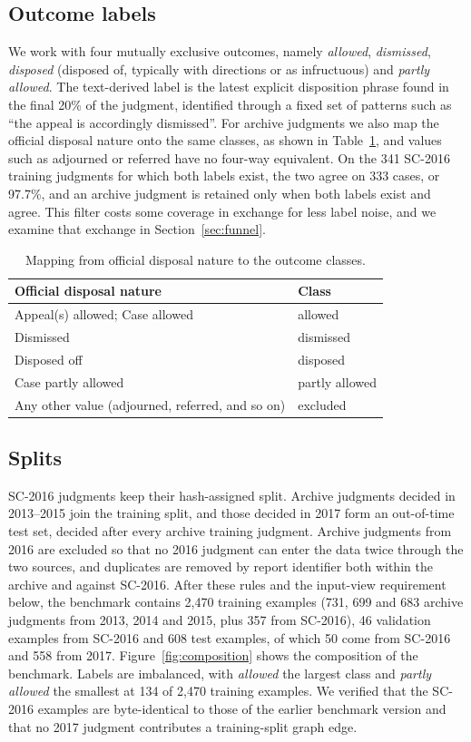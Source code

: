 \documentclass[11pt,a4paper]{article}
\newcommand{\cls}[1]{\emph{#1}}
\begin{document}
\subsection{Outcome labels}
We work with four mutually exclusive outcomes, namely \cls{allowed}, \cls{dismissed}, \cls{disposed} (disposed of, typically with directions or as infructuous) and \cls{partly allowed}. The text-derived label is the latest explicit disposition phrase found in the final 20\% of the judgment, identified through a fixed set of patterns such as ``the appeal is accordingly dismissed''. For archive judgments we also map the official disposal nature onto the same classes, as shown in Table~\ref{tab:map}, and values such as adjourned or referred have no four-way equivalent. On the 341 SC-2016 training judgments for which both labels exist, the two agree on 333 cases, or 97.7\%, and an archive judgment is retained only when both labels exist and agree. This filter costs some coverage in exchange for less label noise, and we examine that exchange in Section~\ref{sec:funnel}.

\begin{table}[t]\centering\small
\caption{Mapping from official disposal nature to the outcome classes.}\label{tab:map}
\begin{tabular}{ll}\toprule Official disposal nature & Class\\\midrule Appeal(s) allowed; Case allowed & allowed\\ Dismissed & dismissed\\ Disposed off & disposed\\ Case partly allowed & partly allowed\\ Any other value (adjourned, referred, and so on) & excluded\\\bottomrule\end{tabular}
\end{table}

\subsection{Splits}
SC-2016 judgments keep their hash-assigned split. Archive judgments decided in 2013--2015 join the training split, and those decided in 2017 form an out-of-time test set, decided after every archive training judgment. Archive judgments from 2016 are excluded so that no 2016 judgment can enter the data twice through the two sources, and duplicates are removed by report identifier both within the archive and against SC-2016. After these rules and the input-view requirement below, the benchmark contains 2,470 training examples (731, 699 and 683 archive judgments from 2013, 2014 and 2015, plus 357 from SC-2016), 46 validation examples from SC-2016 and 608 test examples, of which 50 come from SC-2016 and 558 from 2017. Figure~\ref{fig:composition} shows the composition of the benchmark. Labels are imbalanced, with \cls{allowed} the largest class and \cls{partly allowed} the smallest at 134 of 2,470 training examples. We verified that the SC-2016 examples are byte-identical to those of the earlier benchmark version and that no 2017 judgment contributes a training-split graph edge.
\end{document}
